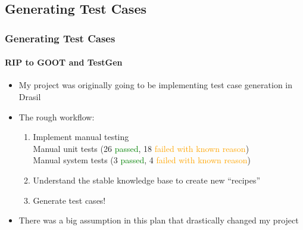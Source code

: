 \documentclass{beamer}
\begin{document}
\subsection{Generating Test Cases}

\begin{frame}
    \frametitle{Generating Test Cases}
    \framesubtitle{RIP to GOOT and TestGen}
    \begin{itemize}
        \item My project was originally going to be implementing
              test case generation in Drasil
        \item<2-> The rough workflow:
              \begin{enumerate}
                  \item<2-> Implement manual testing \\
                        Manual unit tests (26 \textcolor{green}{passed},
                        18 \textcolor{orange}{failed with known reason}) \\
                        Manual system tests (3 \textcolor{green}{passed},
                        4 \textcolor{orange}{failed with known reason})
                  \item<3-> Understand the {stable
                                knowledge base} to create new ``recipes''
                  \item<4-> Generate test cases!
              \end{enumerate}
        \item<5-> There was a big assumption in this plan that drastically
              changed my project
    \end{itemize}
\end{frame}
\end{document}
